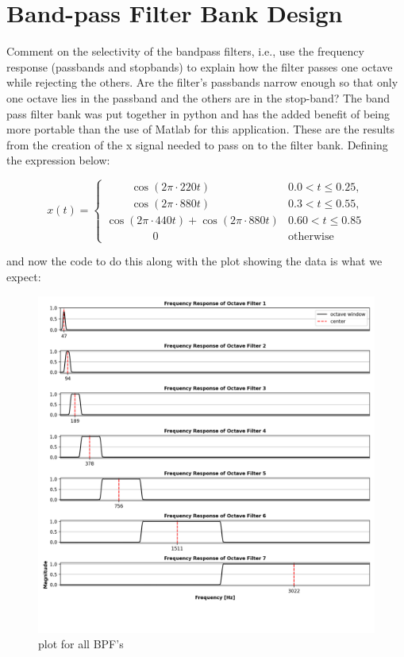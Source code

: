 \documentclass[a4paper, 11pt]{exam}
\begin{document}
\section{Band-pass Filter Bank Design}
 Comment on the selectivity of the bandpass filters, i.e., use the frequency response (passbands and stopbands) to explain how the filter passes one octave while rejecting the others. Are the filter’s passbands narrow enough so that only one octave lies in the passband and the others are in
 the stop-band?
The band pass filter bank was put together in python and has the added benefit of being more portable than the use of Matlab for this application. These are the results from the creation of the x signal needed to pass on to the filter bank. Defining the expression below:
\begin{center}
  \[
    x(t) =
    \begin{cases}
      \ \ \ \ \ \ \ \ \ \ \cos{(2\pi\cdot 220 t)} & 0.0 < t \le 0.25 , \\
      \ \ \ \ \ \ \ \ \ \ \cos{(2\pi\cdot 880 t)} & 0.3 < t \le 0.55 , \\
      \cos{(2\pi\cdot 440 t)} + \cos{(2\pi\cdot 880 t)} & 0.60 < t \le 0.85\\
      \ \ \ \ \ \ \ \ \ \ \ \ \ \ \ \ \ \ \ 0\ \ & \text{otherwise}
    \end{cases}
    \]
\end{center}
\newpage
and now the code to do this along with the plot showing the data is what we expect:\\  
\begin{figure}[h!]
  \centering
  \hspace*{-1.5cm}\includegraphics[width=18cm]{../images/post_lock_freq_data.png}
  \caption{plot for all BPF's}
  \label{fig:bandpass}
\end{figure}
\end{document}
